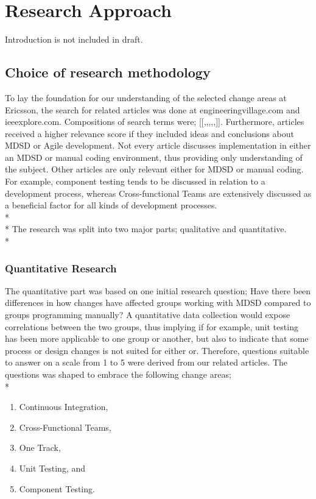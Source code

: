 \documentclass[final_report_innit.tex]{subfiles}
\begin{document}
\section{Research Approach}
Introduction is not included in draft.

\subsection{Choice of research methodology}
To lay the foundation for our understanding of the selected change areas at Ericsson, the search for related articles was done at engineeringvillage.com and ieeexplore.com. Compositions of search terms were; [[{},{},{},{},{},{}]]. Furthermore, articles received a higher relevance score if they included ideas and conclusions about MDSD or Agile development. Not every article discusses implementation in either an MDSD or manual coding environment, thus providing only understanding of the subject. Other articles are only relevant either for MDSD or manual coding. For example, component testing tends to be discussed in relation to a development process, whereas Cross-functional Teams are extensively discussed as a beneficial factor for all kinds of development processes.
\\*
\\*
The research was split into two major parts; qualitative and quantitative.
\\*
\subsubsection{Quantitative Research}
The quantitative part was based on one initial research question; Have there been differences in how changes have affected groups working with MDSD compared to groups programming manually? A quantitative data collection would expose correlations between the two groups, thus implying if for example, unit testing has been more applicable to one group or another, but also to indicate that some process or design changes is not suited for either or. Therefore, questions suitable to answer on a scale from 1 to 5 were derived from our related articles. The questions was shaped to embrace the following change areas;
\\*
\begin{enumerate}
	\item Continuous Integration,
	\item Cross-Functional Teams,
	\item One Track,
	\item Unit Testing, and
	\item Component Testing.
\end{enumerate}
\end{document}

